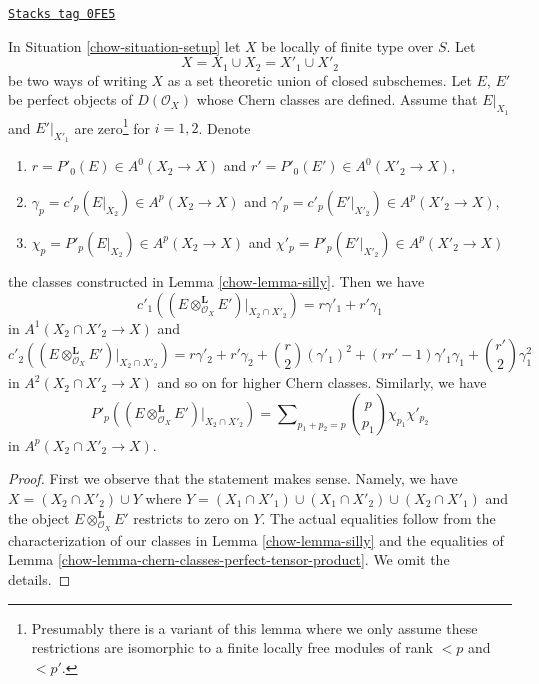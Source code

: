 \begin{lemma}
\label{chow-lemma-silly-tensor-product}
\href{https://stacks.math.columbia.edu/tag/0FE5}{\texttt{Stacks tag 0FE5}}

In Situation \ref{chow-situation-setup} let $X$ be locally of finite type over $S$.
Let
$$
X = X_1 \cup X_2 = X'_1 \cup X'_2
$$
be two ways of writing $X$ as a set theoretic union of closed subschemes.
Let $E$, $E'$ be perfect objects of $D(\mathcal{O}_X)$
whose Chern classes are defined.
Assume that $E|_{X_1}$ and $E'|_{X'_1}$ are zero\footnote{Presumably there
is a variant of this lemma where we only assume these restrictions are
isomorphic to a finite locally free modules
of rank $< p$ and $< p'$.} for $i = 1, 2$. Denote
\begin{enumerate}
\item $r = P'_0(E) \in A^0(X_2 \to X)$ and
$r' = P'_0(E') \in A^0(X'_2 \to X)$,
\item $\gamma_p = c'_p(E|_{X_2}) \in A^p(X_2 \to X)$ and
$\gamma'_p = c'_p(E'|_{X'_2}) \in A^p(X'_2 \to X)$,
\item $\chi_p = P'_p(E|_{X_2}) \in A^p(X_2 \to X)$ and
$\chi'_p = P'_p(E'|_{X'_2}) \in A^p(X'_2 \to X)$
\end{enumerate}
the classes constructed in Lemma \ref{chow-lemma-silly}. Then we have
$$
c'_1((E \otimes_{\mathcal{O}_X}^\mathbf{L} E')|_{X_2 \cap X'_2}) =
r \gamma'_1 + r' \gamma_1
$$
in $A^1(X_2 \cap X'_2 \to X)$ and
$$
c'_2((E \otimes_{\mathcal{O}_X}^\mathbf{L} E')|_{X_2 \cap X'_2}) =
r \gamma'_2 + r' \gamma_2 + {r \choose 2} (\gamma'_1)^2 +
(rr' - 1) \gamma'_1\gamma_1 + {r' \choose 2} \gamma_1^2
$$
in $A^2(X_2 \cap X'_2 \to X)$ and so on for higher Chern classes.
Similarly, we have
$$
P'_p((E \otimes_{\mathcal{O}_X}^\mathbf{L} E')|_{X_2 \cap X'_2}) =
\sum\nolimits_{p_1 + p_2 = p}
{p \choose p_1} \chi_{p_1} \chi'_{p_2}
$$
in $A^p(X_2 \cap X'_2 \to X)$.
\end{lemma}

\begin{proof}

First we observe that the statement makes sense. Namely, we have
$X = (X_2 \cap X'_2) \cup Y$ where
$Y = (X_1 \cap X'_1) \cup (X_1 \cap X'_2) \cup (X_2 \cap X'_1)$
and the object $E \otimes_{\mathcal{O}_X}^\mathbf{L} E'$
restricts to zero on $Y$.
The actual equalities follow from the characterization
of our classes in Lemma \ref{chow-lemma-silly}
and the equalities of Lemma \ref{chow-lemma-chern-classes-perfect-tensor-product}.
We omit the details.
\end{proof}

